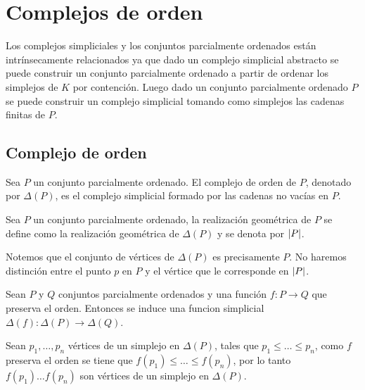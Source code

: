 \chapter{Complejos de orden}
Los complejos simpliciales y los conjuntos parcialmente ordenados están intrínsecamente relacionados ya que dado un complejo simplicial abstracto se puede construir un conjunto parcialmente ordenado a partir de ordenar los simplejos de $K$ por contención. Luego dado un conjunto parcialmente ordenado $P$ se puede construir un complejo simplicial tomando como simplejos las cadenas finitas de $P$. 
 
\section{Complejo de orden}
\begin{Defi}
Sea $P$ un conjunto parcialmente ordenado. El complejo de orden de $P$, denotado por $\Delta(P)$, es el complejo simplicial formado por las cadenas no vacías en $P$.
\end{Defi}

\begin{Defi}
Sea $P$ un conjunto parcialmente ordenado, la realización geométrica de $P$ se define como la realización geométrica de $\Delta(P)$ y se denota por $\left| P \right|$. 
\end{Defi}

Notemos que el conjunto de vértices de $\Delta(P)$ es precisamente $P$. No haremos distinción entre el punto $p$ en $P$ y el vértice que le corresponde en $\left| P \right|$.
\begin{Teo}
Sean $P$ y $Q$ conjuntos parcialmente ordenados y una función $f\colon
P \rightarrow Q$ que preserva el orden. Entonces se induce una
funcion simplicial $\Delta(f)\colon \Delta(P)\to\Delta(Q)$.
\end{Teo}
\begin{Dem}

Sean $p_1,\ldots,p_n$ vértices de un simplejo en $\Delta(P)$, tales que $p_1\leqslant\dots \leqslant p_n$, como $f$ preserva el orden se tiene que $f(p_1)\leqslant\dots \leqslant f(p_n)$, por lo tanto $f(p_1)\dots f(p_n)$ son vértices de un simplejo en $\Delta(P)$. 
\end{Dem}

